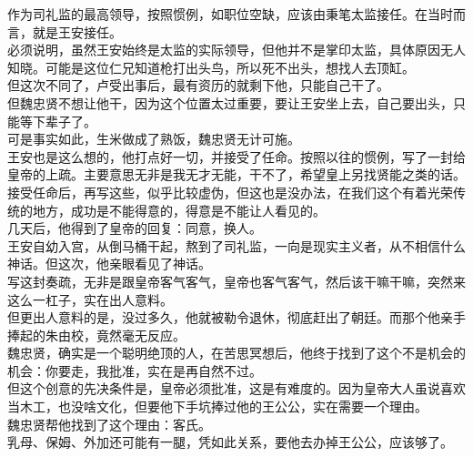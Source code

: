 \begin{multicols}{\theparacolNo}
作为司礼监的最高领导，按照惯例，如职位空缺，应该由秉笔太监接任。在当时而言，就是王安接任。\\

必须说明，虽然王安始终是太监的实际领导，但他并不是掌印太监，具体原因无人知晓。可能是这位仁兄知道枪打出头鸟，所以死不出头，想找人去顶缸。\\

但这次不同了，卢受出事后，最有资历的就剩下他，只能自己干了。\\

但魏忠贤不想让他干，因为这个位置太过重要，要让王安坐上去，自己要出头，只能等下辈子了。\\

可是事实如此，生米做成了熟饭，魏忠贤无计可施。\\

王安也是这么想的，他打点好一切，并接受了任命。按照以往的惯例，写了一封给皇帝的上疏。主要意思无非是我无才无能，干不了，希望皇上另找贤能之类的话。\\

接受任命后，再写这些，似乎比较虚伪，但这也是没办法，在我们这个有着光荣传统的地方，成功是不能得意的，得意是不能让人看见的。\\

几天后，他得到了皇帝的回复：同意，换人。\\

王安自幼入宫，从倒马桶干起，熬到了司礼监，一向是现实主义者，从不相信什么神话。但这次，他亲眼看见了神话。\\

写这封奏疏，无非是跟皇帝客气客气，皇帝也客气客气，然后该干嘛干嘛，突然来这么一杠子，实在出人意料。\\

但更出人意料的是，没过多久，他就被勒令退休，彻底赶出了朝廷。而那个他亲手捧起的朱由校，竟然毫无反应。\\

魏忠贤，确实是一个聪明绝顶的人，在苦思冥想后，他终于找到了这个不是机会的机会：你要走，我批准，实在是再自然不过。\\

但这个创意的先决条件是，皇帝必须批准，这是有难度的。因为皇帝大人虽说喜欢当木工，也没啥文化，但要他下手坑捧过他的王公公，实在需要一个理由。\\

魏忠贤帮他找到了这个理由：客氏。\\

乳母、保姆、外加还可能有一腿，凭如此关系，要他去办掉王公公，应该够了。\\


\end{multicols}
